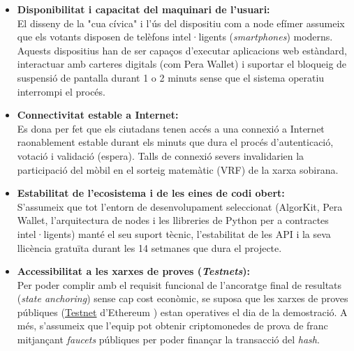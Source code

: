 \begin{itemize}
    \item \textbf{Disponibilitat i capacitat del maquinari de l'usuari:} \\
    El disseny de la "cua cívica" i l'ús del dispositiu com a node efímer assumeix que els votants disposen de telèfons intel·ligents (\textit{smartphones}) moderns. Aquests dispositius han de ser capaços d'executar aplicacions web estàndard, interactuar amb carteres digitals (com Pera Wallet) i suportar el bloqueig de suspensió de pantalla durant 1 o 2 minuts sense que el sistema operatiu interrompi el procés.
    
    \item \textbf{Connectivitat estable a Internet:} \\
    Es dona per fet que els ciutadans tenen accés a una connexió a Internet raonablement estable durant els minuts que dura el procés d'autenticació, votació i validació (espera). Talls de connexió severs invalidarien la participació del mòbil en el sorteig matemàtic (VRF) de la xarxa sobirana.
    
    \item \textbf{Estabilitat de l'ecosistema i de les eines de codi obert:} \\
    S'assumeix que tot l'entorn de desenvolupament seleccionat (AlgorKit, Pera Wallet, l'arquitectura de nodes i les llibreries de Python per a contractes intel·ligents) manté el seu suport tècnic, l'estabilitat de les API i la seva llicència gratuïta durant les 14 setmanes que dura el projecte.
    
    \item \textbf{Accessibilitat a les xarxes de proves (\textit{Testnets}):} \\
    Per poder complir amb el requisit funcional de l'ancoratge final de resultats (\textit{state anchoring}) sense cap cost econòmic, se suposa que les xarxes de proves públiques (\hyperlink{def:testnet}{Testnet} d'Ethereum \cite{sepolia}) estan operatives el dia de la demostració. A més, s'assumeix que l'equip pot obtenir criptomonedes de prova de franc mitjançant \textit{faucets} públiques per poder finançar la transacció del \textit{hash}.
\end{itemize}